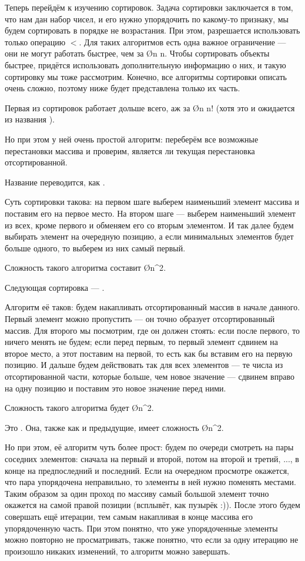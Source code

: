 Теперь перейдём к изучению сортировок. Задача сортировки заключается в том, что нам дан набор чисел, и его нужно упорядочить по какому-то признаку, мы будем сортировать в порядке не возрастания. При этом, разрешается использовать только операцию $<$. Для таких алгоритмов есть одна важное ограничение — они не могут работать быстрее, чем за \O{n \log n}. Чтобы сортировать объекты быстрее, придётся использовать дополнительную информацию о них, и такую сортировку мы тоже рассмотрим. Конечно, все алгоритмы сортировки описать очень сложно, поэтому ниже будет представлена только их часть.

Первая из сортировок работает дольше всего, аж за \O{n \cdot n!} (хотя это и ожидается из названия ).

Но при этом у ней очень простой алгоритм: переберём все возможные перестановки массива и проверим, является ли текущая перестановка отсортированной. 

Название переводится, как .

Суть сортировки такова: на первом шаге выберем наименьший элемент массива и поставим его на первое место. На втором шаге — выберем наименьший элемент из всех, кроме первого и обменяем его со вторым элементом. И так далее будем выбирать элемент на очередную позицию, а если минимальных элементов будет больше одного, то выберем из них самый первый.

Сложность такого алгоритма составит \O{n^2}.

Следующая сортировка — .

Алгоритм её таков: будем накапливать отсортированный массив в начале данного. Первый элемент можно пропустить — он точно образует отсортированный массив. Для второго мы посмотрим, где он должен стоять: если после первого, то ничего менять не будем; если перед первым, то первый элемент сдвинем на второе место, а этот поставим на первой, то есть как бы вставим его на первую позицию. И дальше будем действовать так для всех элементов — те числа из отсортированной части, которые больше, чем новое значение — сдвинем вправо на одну позицию и поставим это новое значение перед ними.

Сложность такого алгоритма будет \O{n^2}.

Это . Она, также как и предыдущие, имеет сложность \O{n^2}.

Но при этом, её алгоритм чуть более прост: будем по очереди смотреть на пары соседних элементов: сначала на первый и второй, потом на второй и третий, ..., в конце на предпоследний и последний. Если на очередном просмотре окажется, что пара упорядочена неправильно, то элементы в ней нужно поменять местами. Таким образом за один проход по массиву самый большой элемент точно окажется на самой правой позиции (всплывёт, как пузырёк :)). После этого будем совершать ещё итерации, тем самым накапливая в конце массива его упорядоченную часть. При этом понятно, что уже упорядоченные элементы можно повторно не просматривать, также понятно, что если за одну итерацию не произошло никаких изменений, то алгоритм можно завершать.

